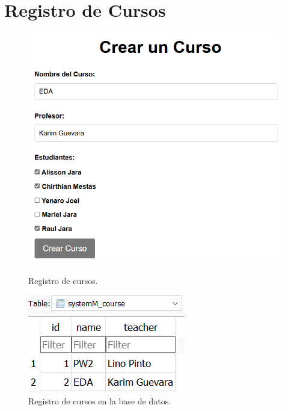 \documentclass{article}
\begin{document}
\section{Registro de Cursos}
\begin{figure}[H]
	\centering
	\begin{minipage}{0.3\textwidth}
		\centering
		\includegraphics[width=\linewidth,keepaspectratio]{img/registerCourse.png}
		\caption{Registro de cursos.}
	\end{minipage}\hfill
	\begin{minipage}{0.3\textwidth}
		\centering
		\includegraphics[width=\linewidth,keepaspectratio]{img/registerCBD.png}
		\caption{Registro de cursos en la base de datos.}

\end{minipage}
\end{figure}
\end{document}
